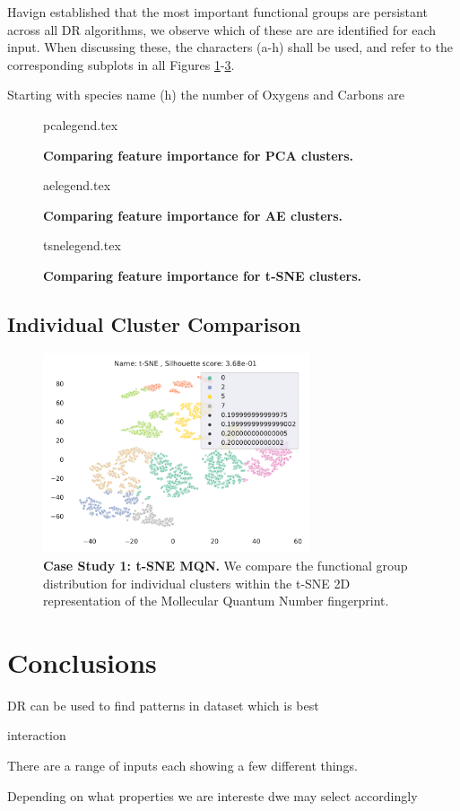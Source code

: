 Havign established that the most important functional groups are persistant across all DR algorithms, we observe which of these are are identified for each input. When discussing these, the characters (a-h) shall be used, and refer to the corresponding subplots in all Figures \ref{fig:pcalegend}-\ref{fig:tsnelegend}.

Starting with species name (h) the number of Oxygens and Carbons are


\begin{figure}[H]
    {pcalegend.tex}
    \caption{\textbf{Comparing feature importance for PCA clusters.}}
    \label{fig:pcalegend}
\end{figure}
\begin{figure}[H]
    {aelegend.tex}
    \caption{\textbf{Comparing feature importance for AE clusters.}}
    \label{fig:aelegend}
\end{figure}
\begin{figure}[H]
    {tsnelegend.tex}
    \caption{\textbf{Comparing feature importance for t-SNE clusters.}}
    \label{fig:tsnelegend}
\end{figure}


\subsection{Individual Cluster Comparison}\label{sec:selectcomp}


\begin{figure}[H]
    \includegraphics[width=0.7\textwidth]{outputs/t-SNE/mqn_all.pdf}
    \caption{\textbf{Case Study 1: t-SNE MQN.} We compare the functional group distribution for individual clusters within the t-SNE 2D representation of the Mollecular Quantum Number fingerprint.}
    \label{fig:tsnemqncase}
\end{figure}



\section{Conclusions}

DR can be used to find patterns in dataset
which is best

interaction

There are a range of inputs
each showing a few different things.

Depending on what properties we are intereste dwe may select accordingly

